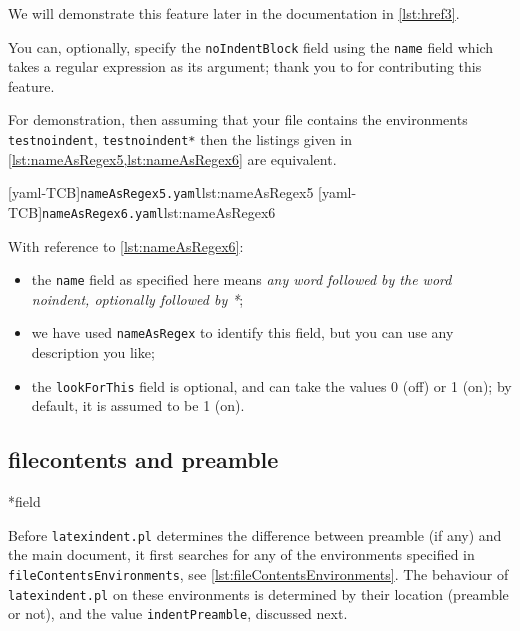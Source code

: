  We will demonstrate this feature later in the documentation in \cref{lst:href3}.

 You can, optionally, specify  the
 \texttt{noIndentBlock} field using the \texttt{name} field which takes a regular
 expression as its argument; thank you to \cite{XuehaiPan} for contributing this feature.

 \begin{example}
 For demonstration, then assuming that your file contains the environments
 \texttt{testnoindent}, \texttt{testnoindent*} then the listings given in
 \cref{lst:nameAsRegex5,lst:nameAsRegex6} are equivalent.

 \begin{widepage}
  \begin{cmhtcbraster}[raster column skip=.1\linewidth]
   [yaml-TCB]{\texttt{nameAsRegex5.yaml}}{lst:nameAsRegex5}
   [yaml-TCB]{\texttt{nameAsRegex6.yaml}}{lst:nameAsRegex6}
  \end{cmhtcbraster}
 \end{widepage}

 With reference to \cref{lst:nameAsRegex6}:
 \begin{itemize}
  \item the \texttt{name} field as specified here means \emph{any word followed by the
        word noindent, optionally followed by *};
  \item we have used \texttt{nameAsRegex} to identify this field, but you can use any
        description you like;
  \item the \texttt{lookForThis} field is optional, and can take the values 0 (off) or 1
        (on); by default, it is assumed to be 1 (on).
 \end{itemize}
 \end{example}

\subsection{filecontents and preamble}\label{subsec:filecontents:preamble}
*{field}

 Before \texttt{latexindent.pl} determines the difference between preamble (if any) and
 the main document, it first searches for any of the environments specified in
 \texttt{fileContentsEnvironments}, see \cref{lst:fileContentsEnvironments}. The
 behaviour of \texttt{latexindent.pl} on these environments is determined by their
 location (preamble or not), and the value \texttt{indentPreamble}, discussed next.

